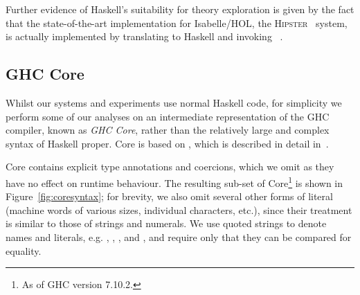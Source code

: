 Further evidence of Haskell's suitability for theory exploration is given by the
fact that the state-of-the-art implementation for Isabelle/HOL, the
\textsc{Hipster}~\cite{Hipster} system, is actually implemented by translating
to Haskell and invoking \hspec{}~\cite{claessen2013automating}.

\subsection{GHC Core}
\label{sec:ghccore}

Whilst our systems and experiments use normal Haskell code, for simplicity we
perform some of our analyses on an intermediate representation of the
\textsc{GHC} compiler, known as \emph{GHC Core}, rather than the relatively
large and complex syntax of Haskell proper. Core is based on \fc{}, which is
described in detail in~\cite[Appendix C]{sulzmann2007system}.

Core contains explicit type annotations and coercions, which we omit as they
have no effect on runtime behaviour. The resulting sub-set of Core\footnote{As
  of GHC version 7.10.2.} is shown in Figure~\ref{fig:coresyntax}; for brevity,
we also omit several other forms of literal (machine words of various sizes,
individual characters, etc.), since their treatment is similar to those of
strings and numerals. We use quoted strings to denote names and literals,
e.g. , , ,  and , and require only that they can be compared for
equality.

